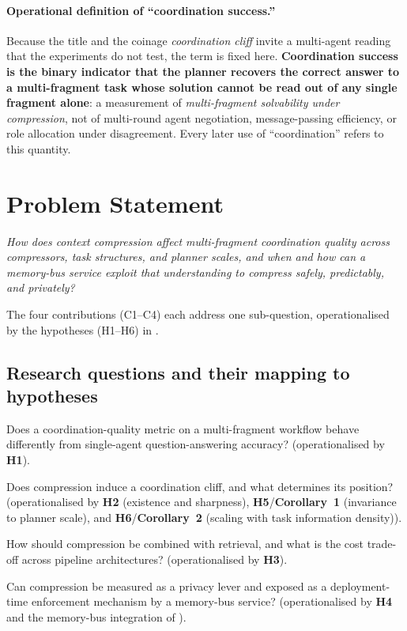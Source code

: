 \paragraph{Operational definition of ``coordination success.''}
Because the title and the coinage \emph{coordination cliff} invite a
multi-agent reading that the experiments do not test, the term is fixed
here. \textbf{Coordination success is the binary indicator that the
planner recovers the correct answer to a multi-fragment task whose
solution cannot be read out of any single fragment alone}: a
measurement of \emph{multi-fragment solvability under compression}, not
of multi-round agent negotiation, message-passing efficiency, or role
allocation under disagreement. Every later use of ``coordination''
refers to this quantity.

\section{Problem Statement}
\label{sec:problem}

\emph{How does context compression affect multi-fragment
coordination quality across compressors, task structures, and
planner scales, and when and how can a memory-bus service
exploit that understanding to compress safely, predictably, and
privately?}

The four contributions (C1--C4) each address one sub-question,
operationalised by the hypotheses (H1--H6) in .

\subsection{Research questions and their mapping to hypotheses}
\label{sec:rq_mapping}

\begin{description}\setlength\itemsep{2pt}
\item[RQ1 (metric).] Does a coordination-quality metric on a
multi-fragment workflow behave differently from single-agent
question-answering accuracy? (operationalised by \textbf{H1}).
\item[RQ2 (characterisation).] Does compression induce a
coordination cliff, and what determines its position?
(operationalised by \textbf{H2} (existence and sharpness),
\textbf{H5}/\textbf{Corollary~1} (invariance to planner scale),
and \textbf{H6}/\textbf{Corollary~2} (scaling with task
information density)).
\item[RQ3 (deployment).] How should compression be combined with
retrieval, and what is the cost trade-off across pipeline
architectures? (operationalised by \textbf{H3}).
\item[RQ4 (governance).] Can compression be measured as a privacy
lever and exposed as a deployment-time enforcement mechanism by a
memory-bus service? (operationalised by \textbf{H4} and the
memory-bus integration of ).
\end{description}

